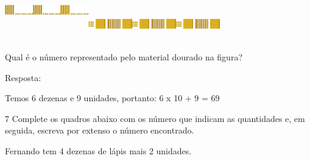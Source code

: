 \includegraphics[width=0.47504in,height=1.02509in]{media/image3.png}\includegraphics[width=0.47504in,height=1.02509in]{media/image3.png}\includegraphics[width=0.47504in,height=1.02509in]{media/image3.png}\includegraphics[width=0.75006in,height=0.55838in]{media/image4.png}\includegraphics[width=0.75006in,height=0.55838in]{media/image4.png}\includegraphics[width=0.75006in,height=0.55838in]{media/image4.png}

Qual é o número representado pelo material dourado na figura?


Resposta:

Temos 6 dezenas e 9 unidades, portanto: 6 x 10 + 9 = 69

\num{7} Complete os quadros abaixo com os número que indicam as quantidades e, em
seguida, escreva por extenso o número encontrado.

\begin{escolha}

\item
  Fernando tem 4 dezenas de lápis mais 2 unidades.
\end{escolha}

